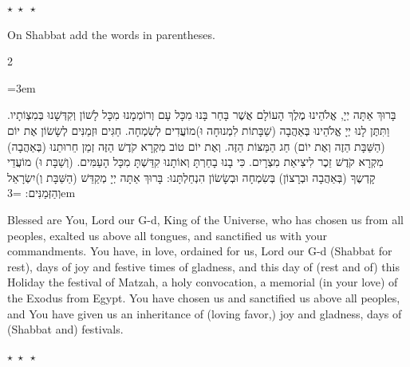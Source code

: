 \documentclass[11pt, openany]{book}
\newcommand{\instruction}[1]{%
  \par\vspace{3pt}
  \begin{tcolorbox}[
    enhanced,
    breakable,
    colback=sederlight,
    colframe=sedergold!40,
    boxrule=1pt,
    left=10pt,
    right=6pt,
    top=4pt,
    bottom=4pt,
    borderline west={3pt}{0pt}{sederwine!60},
    arc=6pt,
    outer arc=6pt,
  ]
    {\kidsinstructionfont\small\textcolor{sederwine}{#1}}
  \end{tcolorbox}
  \par\vspace{2pt}
}
\newcommand{\sederdivider}{%
  \par\vspace{6pt}
  \begin{center}
    \textcolor{sedergold}{\large$\star\;\star\;\star$}
  \end{center}
  \par\vspace{6pt}
}
\newenvironment{bilingual}{%
  \par\vspace{4pt}%
  \begin{paracol}{2}%
}{%
  \end{paracol}%
  \par\vspace{2pt}%
}
\newenvironment{hebrewcol}{%
  \switchcolumn[1]%
  \begingroup
  \RTL
  \hebrewfont\large
  \setstretch{1.4}%
  \emergencystretch=3em
  \tolerance=9999
  \parindent=0pt\relax
}{%
  \endRTL
  \endgroup
}
\newenvironment{englishcol}{%
  \switchcolumn[0]%
  \begingroup
  \setstretch{1.4}%
  \emergencystretch=3em
  \tolerance=9999
  \normalsize
  \rightskip=0.12in\relax
}{%
  \endgroup
}
\newcommand{\parasep}{%
  \par\vspace{3pt}
  \begin{center}
    \textcolor{sedergold!50}{\small$\star\;\star\;\star$}
  \end{center}
  \par\vspace{3pt}
}
\begin{document}
\parasep

\instruction{On Shabbat add the words in parentheses.}

\begin{bilingual}
\begin{hebrewcol}
בָּרוּךְ אַתָּה יְיָ, אֱלֹהֵינוּ מֶלֶךְ הָעוֹלָם אֲשֶׁר בָּחַר בָּנוּ מִכָּל עָם וְרוֹמְמָנוּ מִכָּל לָשׁוֹן וְקִדְּשָׁנוּ בְּמִצְוֹתָיו. וַתִּתֶּן לָנוּ יְיָ אֱלֹהֵינוּ בְּאַהֲבָה (שַׁבָּתוֹת לִמְנוּחָה וּ)מוֹעֲדִים לְשִׂמְחָה. חַגִּים וּזְמַנִּים לְשָׂשׂוֹן אֶת יוֹם (הַשַּׁבָּת הַזֶה וְאֶת יוֹם) חַג הַמַּצּוֹת הַזֶּה. וְאֶת יוֹם טוֹב מִקְרָא קֹדֶשׁ הַזֶּה זְמַן חֵרוּתֵנוּ (בְּאַהֲבָה) מִקְרָא קֹדֶשׁ זֵכֶר לִיצִיאַת מִצְרָיִם. כִּי בָנוּ בָחַרְתָּ וְאוֹתָנוּ קִדַּשְׁתָּ מִכָּל הָעַמִּים. (וְשַׁבָּת וּ) מוֹעֲדֵי קָדְשֶךָ (בְּאַהֲבָה וּבְרָצוֹן) בְּשִׂמְחָה וּבְשָׂשׂוֹן הִנְחַלְתָּנוּ: בָּרוּךְ אַתָּה יְיָ מְקַדֵּשׁ (הַשַּׁבָּת וְ)יִשְׂרָאֵל וְהַזְּמַנִּים:
\end{hebrewcol}
\begin{englishcol}
Blessed are You, Lord our G-d, King of the Universe, who has chosen us from all peoples, exalted us above all tongues, and sanctified us with your commandments. You have, in love, ordained for us, Lord our G-d (Shabbat for rest), days of joy and festive times of gladness, and this day of (rest and of) this Holiday the festival of Matzah, a holy convocation, a memorial (in your love) of the Exodus from Egypt. You have chosen us and sanctified us above all peoples, and You have given us an inheritance of (loving favor,) joy and gladness, days of (Shabbat and) festivals.
\end{englishcol}
\end{bilingual}

\sederdivider
\end{document}
